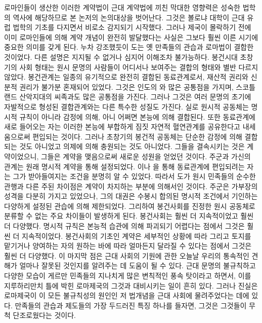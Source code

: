 로마인들이 생산한 이러한 계약법이
근대 계약법에 끼친 막대한 영향력은
성숙한 법학의 역사에 해당하므로
본 논저의 논의대상을 벗어난다.
그것은
볼로냐 대학이 근대 유럽 법학의 기초를 다지면서
비로소
감지되기 시작했다.
그러나
제국이 몰락하기 전에 이미
로마인들에 의해
계약 개념이
완전히 발달했다는 사실은
그보다 훨씬 이른 시기에
중요한 의미를 갖게 된다.
누차 강조했듯이
도는 옛 만족들의 관습과 로마법이
결합한 것이었다.
다른 설명은 지지될 수 없거나 심지어 이해조차 불가능하다.
봉건시대 초창기의 사회 형태는
원시 문명의 사람들이 어디서나 보여주는
결합의 형태와 별반 다르지 않았다.
봉건관계는 일종의 유기적으로 완전히 결합된 동료관계로서,
재산적 권리와 신분적 권리가 불가분 혼재되어 있었다.
그것은 인도의 와 많은 공통점을 가지며,
스코틀랜드 산악지대의 씨족과도 많은 공통점을 가진다.
그러나 그것은 여러 문명의 초기에 자발적으로 형성된 결합관계와는 다른
특수한 성질도 가진다.
실로 원시적 공동체는 명시적 규칙이 아니라 감정에 의해,
아니 어쩌면 본능에 의해 결합된다.
또한 동료관계에 새로 들어오는 자는
이러한 본능에 부합하게
짐짓
자연적 혈연관계를 공유한다고 내세움으로써 편입되는 것이다.
그러나 초창기의 봉건적 공동체는 단순한 감정에 의해
결합되는 것도 아니었고
의제에 의해 충원되는 것도 아니었다.
그들을 결속시키는 것은 계약이었으니,
그들은 계약을 맺음으로써 새로운 성원을 얻었던 것이다.
주군과 가신의 관계는 원래 명시적 계약을 통해 설정되었다.
이나
을 통해
동료관계에 편입되려는 자는
그가 받아들여지는 조건을 분명히 알 수 있었다.
따라서 도가 원시 민족들의 순수한 관행과 다른
주된 차이점은 계약이 차지하는 부분에 의해서인 것이다.
주군은 가부장의 성격을 다분히 가지고 있었으나,
그의 대권은
수봉시 합의된 명시적 조건에서 기인하는 다양하게 설정된 관습에 의해
제한되었다.
그리하여 봉건사회를 진정한 원시 공동체로 분류할 수 없는
주요 차이들이 발생하게 된다.
봉건사회는 훨씬 더 지속적이었고 훨씬 더 다양했다.
명시적 규칙은 본능적 습관에 의해 파괴되기 어렵다는 점에서
그것은
훨씬 더 지속적이었다.
봉건사회의 기초인 계약은
세부적인 상황에 따라
그리고
토지를 맡기거나 양여하는 자의 원하는 바에 따라
얼마든지 달라질 수 있다는 점에서
그것은
훨씬 더 다양했다.
이 마지막 점은
근대 사회의 기원에 관한 오늘날 우리의 통속적인 견해가
얼마나 잘못된 것인지를 알려주는 데 도움이 될 수 있다.
근대 문명의 불규칙하고 다양한 모습이
게르만 민족들의 지나치게 많은 변칙적인 풍속 탓이라고 하면서,
이를 지루하리만치 틀에 박힌 로마제국의 그것과 대비시키는 일이 흔히 있다.
그러나 진실은
로마제국이 이 모든 불규칙성의 원인인 저 법개념을
근대 사회에 물려주었다는 데에 있다.
만족들의 관습과 제도들의 가장 두드러진 특징 하나를 들자면,
그것은
그것들이 무척 단조로웠다는 것이다.

